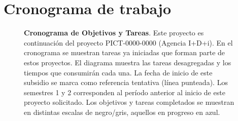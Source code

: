 \section{Cronograma de trabajo} 
\makeatletter
\setlength{\@fptop}{0pt}
\makeatother

\begin{figure}[H]
	

	\caption{{\bfseries{Cronograma de Objetivos y Tareas}}. Este proyecto es
	continuación del proyecto PICT-0000-0000 (Agencia I+D+i). En el
	cronograma se muestran tareas ya iniciadas que forman parte de estos
	proyectos. El diagrama muestra las tareas desagregadas y los tiempos que
	consumirán cada una. La fecha de inicio de este subsidio se marca como
	referencia tentativa (línea punteada). Los semestres 1 y 2 corresponden al
	período anterior al inicio de este proyecto solicitado. Los objetivos y
	tareas completados se muestran en distintas escalas de negro/gris, aquellos
	en progreso en azul.}\label{fig:cronograma}

\end{figure}



